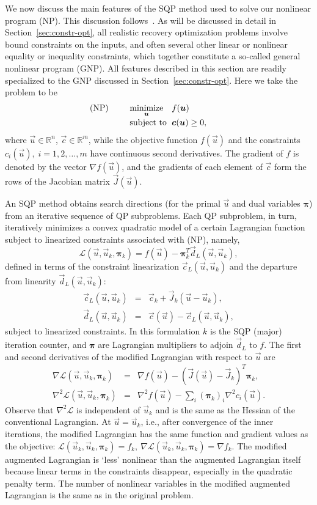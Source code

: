 \documentclass[twocolumn,numbook]{svjour3}          %
\makeatletter
\def\u{{\vec u}}
\def\c{{\vec c}}
\def\d{{\vec d}}
\def\g{{\vec{G}}}
\def\bpi{{\pmb{\pi}}}%
\def\J{{\vec J}}
\def\disp{\displaystyle}
\def\grad{\nabla}
\def\Hess{\nabla^2}
\def\minim{\mathop{\hbox{\rm minimize}}}
\def\minimize#1{{\displaystyle\minim_{#1}}}
\def\Lscr{{\mathcal L}}
\def\subject{\mbox{\rm subject to}}
\def\T{^T\!}
\def\fk{f_k}
\def\ck{\c_k}
\def\Jk{\J_k}
\def\cL{\c_{\scriptscriptstyle L}} %
\def\dL{\d_{\scriptscriptstyle L}} %
\def\problem#1#2#3#4{%
   {\begin{tabular*}{0.47\textwidth}
    {@{}l@{\extracolsep{\fill}}l@{\extracolsep{6pt}}l@{\extracolsep{\fill}}c@{}}
      #1 & $\minimize{#2}$ & $#3$ & $ $ \\[5pt]
         & $\subject$      & $#4$ & $ $
    \end{tabular*}}}
\makeatother
\begin{document}

We now discuss the main features of the SQP method used to solve our
nonlinear program (NP). This discussion follows~\cite{SNOPT}. As will be discussed in detail in Section~\ref{sec:constr-opt}, all realistic recovery optimization problems involve bound constraints on the inputs, and often several other linear or nonlinear equality or inequality constraints, which together constitute a so-called general nonlinear program (GNP). All features described in this section are readily specialized to the GNP discussed in Section~\ref{sec:constr-opt}. Here we take the problem to be
$$
   \problem{(NP)}{\u}{f(\u)}{\c(\u) \ge 0,}
$$
where $\u \in \mathbb R^n$, $\c \in \mathbb R^m$, while the objective function $f(\u)$ and the constraints $c_i(\u), \; i=1,2,\ldots,m$
have continuous second derivatives. The gradient of $f$ is denoted
by the vector 
$\grad f(\u)$, 
and the gradients of each element of $\c$ form
the rows of the Jacobian matrix $\J(\u)$.

An SQP method obtains search directions (for the primal $\u$ and dual variables $\bpi$) from an iterative sequence of QP subproblems. Each QP subproblem, in turn, iteratively minimizes a convex quadratic
model of a certain Lagrangian function subject to
linearized constraints associated with (NP), namely,
\begin{equation}                                 \label{eqn-def-ML}
        \Lscr(\u,\u_k,\bpi_k) = f(\u) - \bpi_k^T \dL(\u,\u_k),
\end{equation}
defined in terms of the constraint linearization $\cL(\u,\u_k)$
and the departure from linearity $\dL(\u,\u_k)$:
\begin{eqnarray*}
        \cL(\u,\u_k) &=& \ck  + \Jk(\u - \u_k),
     \\ \dL(\u,\u_k) &=& \c(\u) - \cL(\u,\u_k),
\end{eqnarray*}
subject to linearized constraints. In this formulation $k$ is the SQP (major) iteration counter, and $\bpi$ are Lagrangian multipliers to adjoin $\dL$ to $f$. The first and second derivatives of the modified Lagrangian with
respect to $\u$ are
\begin{eqnarray*}
        \grad\Lscr(\u,\u_k,\bpi_k) &=& \grad f(\u) - (\J(\u) - \Jk)\T \bpi_k, \\[3pt]
        \Hess\Lscr(\u,\u_k,\bpi_k) &=& \disp \Hess f(\u)
                                           - \sum_i (\bpi_k)_i \Hess c_i(\u).
\end{eqnarray*}
Observe that $\Hess\Lscr$ is independent of $\u_k$
and is the same as the Hessian of the conventional Lagrangian.
At $\u = \u_k$, i.e., after convergence of the inner iterations, the modified Lagrangian has the same function and
gradient values as the objective:
$
           \Lscr(\u_k,\u_k,\bpi_k) = \fk, \ %
     \grad \Lscr(\u_k,\u_k,\bpi_k) = \grad \fk.
$
The modified augmented Lagrangian is `less' nonlinear than the augmented Lagrangian itself
because linear terms in the constraints disappear, especially in the quadratic penalty term.
The number of nonlinear variables in the modified augmented Lagrangian is the same as in the original problem.
\end{document}
